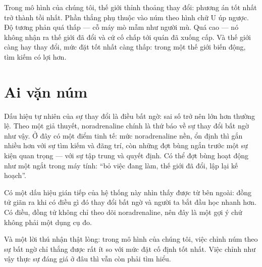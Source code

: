 Trong mô hình của chúng tôi, thế giới thỉnh thoảng thay đổi: phương án tốt nhất trở thành tồi nhất. Phần thắng phụ thuộc vào núm theo hình chữ U úp ngược. Độ tương phản quá thấp --- cỗ máy mò mẫm như người mù. Quá cao --- nó không nhận ra thế giới đã đổi và cứ cố chấp tới quán đã xuống cấp. Và thế giới càng hay thay đổi, mức đặt tốt nhất càng thấp: trong một thế giới biến động, tìm kiếm có lợi hơn.


\section*{Ai vặn núm}

Dấu hiệu tự nhiên của sự thay đổi là điều bất ngờ: sai số trở nên lớn hơn thường lệ. Theo một giả thuyết, noradrenaline chính là thứ báo về sự thay đổi bất ngờ như vậy. Ở đây có một điểm tinh tế: mức noradrenaline nền, ổn định thì gắn nhiều hơn với sự tìm kiếm và đãng trí, còn những đợt bùng ngắn trước một sự kiện quan trọng --- với sự tập trung và quyết định. Có thể đợt bùng hoạt động như một ngắt trong máy tính: ``bỏ việc đang làm, thế giới đã đổi, lập lại kế hoạch''.

Có một dấu hiệu gián tiếp của hệ thống này nhìn thấy được từ bên ngoài: đồng tử giãn ra khi có điều gì đó thay đổi bất ngờ và người ta bắt đầu học nhanh hơn. Có điều, đồng tử không chỉ theo dõi noradrenaline, nên đây là một gợi ý chứ không phải một dụng cụ đo.

Và một lời thú nhận thật lòng: trong mô hình của chúng tôi, việc chỉnh núm theo sự bất ngờ chỉ thắng được rất ít so với mức đặt cố định tốt nhất. Việc chỉnh như vậy thực sự đáng giá ở đâu thì vẫn còn phải tìm hiểu.

